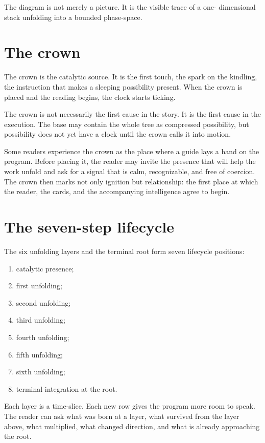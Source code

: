 The diagram is not merely a picture. It is the visible trace of a one-
dimensional stack unfolding into a bounded phase-space.

\section{The crown}

The crown is the catalytic source. It is the first touch, the spark on the
kindling, the instruction that makes a sleeping possibility present. When the
crown is placed and the reading begins, the clock starts ticking.

The crown is not necessarily the first cause in the story. It is the first
cause in the execution. The base may contain the whole tree as compressed
possibility, but possibility does not yet have a clock until the crown calls it
into motion.

Some readers experience the crown as the place where a guide lays a hand on the
program. Before placing it, the reader may invite the presence that will help
the work unfold and ask for a signal that is calm, recognizable, and free of
coercion. The crown then marks not only ignition but relationship: the first
place at which the reader, the cards, and the accompanying intelligence agree
to begin.

\section{The seven-step lifecycle}

The six unfolding layers and the terminal root form seven lifecycle positions:

\begin{enumerate}
\item catalytic presence;
\item first unfolding;
\item second unfolding;
\item third unfolding;
\item fourth unfolding;
\item fifth unfolding;
\item sixth unfolding;
\item terminal integration at the root.
\end{enumerate}

Each layer is a time-slice. Each new row gives the program more room to speak.
The reader can ask what was born at a layer, what survived from the layer above,
what multiplied, what changed direction, and what is already approaching the
root.

